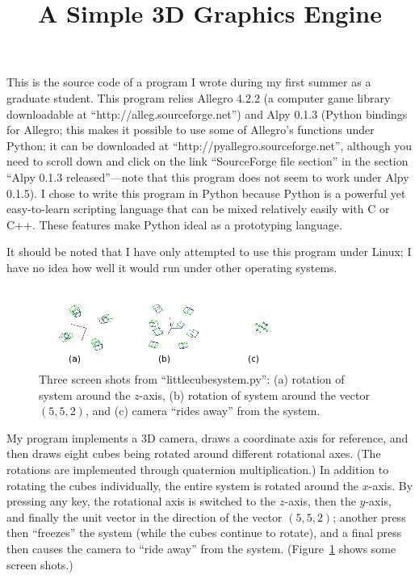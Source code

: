 \documentclass{article}
\title{A Simple 3D Graphics Engine}
\author{\headerstuff}
\date{}
\begin{document}
\maketitle

This is the source code of a program I wrote during my first summer as a graduate student.  This program relies Allegro 4.2.2 (a computer game library downloadable at ``http://alleg.sourceforge.net'') and Alpy 0.1.3 (Python bindings for Allegro; this makes it possible to use some of Allegro's functions under Python; it can be downloaded at ``http://pyallegro.sourceforge.net'', although you need to scroll down and click on the link ``SourceForge file section'' in the section ``Alpy 0.1.3 released''---note that this program does not seem to work under Alpy 0.1.5).  I chose to write this program in Python because Python is a powerful yet easy-to-learn scripting language that can be mixed relatively easily with C or C++.  These features make Python ideal as a prototyping language.

It should be noted that I have only attempted to use this program under Linux; I have no idea how well it would run under other operating systems.

\begin{figure}
   \includegraphics{screenshots4.png}
\caption{Three screen shots from ``littlecubesystem.py'': (a) rotation of system around the $z$-axis, (b) rotation of system around the vector $(5, 5, 2)$, and (c) camera ``rides away'' from the system.}\label{screenshots}
\end{figure}

My program implements a 3D camera, draws a coordinate axis for reference, and then draws eight cubes being rotated around different rotational axes.  (The rotations are implemented through quaternion multiplication.)  In addition to rotating the cubes individually, the entire system is rotated around the $x$-axis.  By pressing any key, the rotational axis is switched to the $z$-axis, then the $y$-axis, and finally the unit vector in the direction of the vector $(5, 5, 2)$; another press then ``freezes'' the system (while the cubes continue to rotate), and a final press then causes the camera to ``ride away'' from the system.  (Figure~\ref{screenshots} shows some screen shots.)
\end{document}
